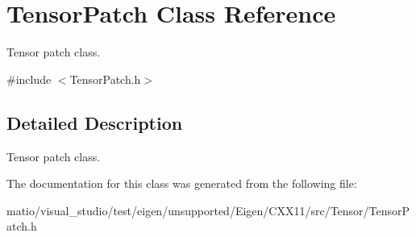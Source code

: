 \hypertarget{class_tensor_patch}{}\section{Tensor\+Patch Class Reference}
\label{class_tensor_patch}


Tensor patch class.  




{\ttfamily \#include $<$Tensor\+Patch.\+h$>$}



\subsection{Detailed Description}
Tensor patch class. 

The documentation for this class was generated from the following file\+:\begin{DoxyCompactItemize}
\item 
matio/visual\+\_\+studio/test/eigen/unsupported/\+Eigen/\+C\+X\+X11/src/\+Tensor/\+Tensor\+Patch.\+h\end{DoxyCompactItemize}
